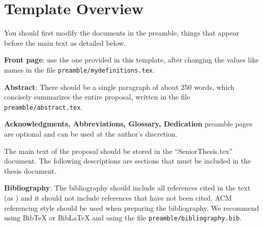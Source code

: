 \documentclass[12pt,oneside]{book} %
\newcommand{\numberedchapter}{ %
	\cleardoublepage %
	\fancyhead[RE]{{\bfseries \leftmark}}%
	\fancyhead[LO]{{\bfseries \rightmark}}}%
\begin{document}

\mainmatter %


\section*{Template Overview}

You should first modify the documents in the preamble, things that appear before the main text as detailed below. 

\textbf{Front page}: use the one provided in this template, after changing the values like names in the file \texttt{preamble/mydefinitions.tex}.

\textbf{Abstract}: There should be a single paragraph of about 250 words, which concisely summarizes the entire proposal, written in the file \texttt{preamble/abstract.tex}.

\textbf{Acknowledgments, Abbreviations, Glossary, Dedication} preamble pages are optional and can be used at the author's discretion. 

The main text of the proposal should be stored in the ``SeniorThesis.tex'' document. The following descriptions are sections that must be included in the thesis document.

\textbf{Bibliography}: The bibliography should include all references cited in the text (as \cite{dasgupta2015comrade}) and it should not include references that have not been cited. ACM referencing style should be used when preparing the bibliography. We recommend using BibTeX or BibLaTeX and using the file \texttt{preamble/bibliography.bib}.


\end{document}
